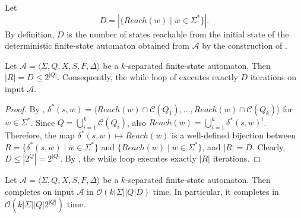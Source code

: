  Let
  \begin{equation*}
    D = |\{ Reach(w) \mid w \in \Sigma^* \}|.
  \end{equation*}
  By definition, $D$ is the number of states reachable from the initial state of the
  deterministic finite-state automaton obtained from $\mathcal{A}$ by the construction
  of .

  \begin{proposition}\label{prop:quasidet_iterations}
    Let $\mathcal{A} = \langle \Sigma, Q, X, S, F, \Delta \rangle$ be a
    $k$-separated finite-state automaton. Then $|R| = D \leq 2^{|Q|}$. Consequently,
    the while loop of  executes exactly $D$ iterations on
    input $\mathcal{A}$.
  \end{proposition}

  \begin{proof}
    By , $\delta^*(s, w) = \langle Reach(w) \cap
    \mathcal{C}(Q_1), \ldots, Reach(w) \cap \mathcal{C}(Q_k) \rangle$ for $w \in
    \Sigma^*$. Since $Q = \bigcup_{i=1}^k \mathcal{C}(Q_i)$, also $Reach(w) =
    \bigcup_{i=1}^k \delta^*(s, w)^i$. Therefore, the map $\delta^*(s, w) \mapsto
    Reach(w)$ is a well-defined bijection between $R = \{ \delta^*(s, w) \mid w \in
    \Sigma^* \}$ and $\{ Reach(w) \mid w \in \Sigma^* \}$, and $|R| = D$. Clearly, $D
    \leq |2^Q| = 2^{|Q|}$. By , the while loop executes
    exactly $|R|$ iterations.
  \end{proof}

  \begin{proposition}\label{prop:quasidet_complexity}
    Let $\mathcal{A} = \langle \Sigma, Q, X, S, F, \Delta \rangle$ be a
    $k$-separated finite-state automaton. Then  completes on
    input $\mathcal{A}$ in $\mathcal{O}(k |\Sigma| |Q| D)$ time. In particular, it
    completes in $\mathcal{O}(k |\Sigma| |Q| 2^{|Q|})$ time.
  \end{proposition}


